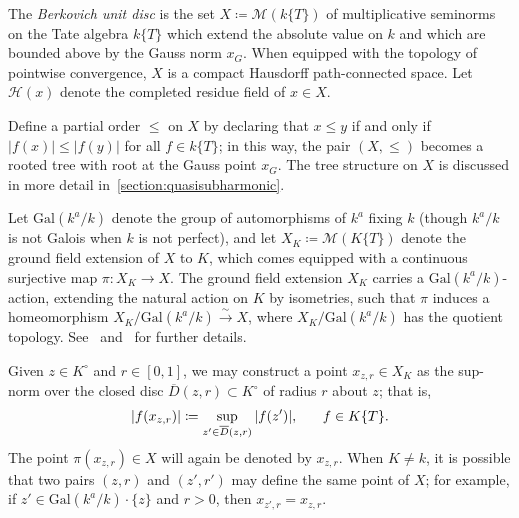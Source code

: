 \documentclass[10pt,reqno]{amsart}
\theoremstyle{plain}
\theoremstyle{definition}
\renewcommand{\H}{\mathcal{H}}
\numberwithin{equation}{section}
\newcommand{\Gal}{\textrm{Gal}}
\newcommand{\M}{\mathcal{M}}
\begin{document}
The \emph{Berkovich unit disc} is the set $X \coloneqq \M(k\{ T \})$ of multiplicative seminorms on the Tate algebra $k\{ T \}$ which extend the absolute value on $k$ and which are bounded above by the Gauss norm $x_G$.
When equipped with the topology of pointwise convergence, $X$ is a compact Hausdorff path-connected space. 
Let $\H(x)$ denote the completed residue field of $x \in X$.

Define a partial order $\leq $ on $X$ by declaring that $x \leq y$ if and only if $|f(x)| \leq |f(y)|$ for all $f \in k\{ T \}$; in this way, the pair $(X, \leq )$ becomes a rooted tree with root at the Gauss point $x_G$. The tree structure on $X$ is discussed in more detail in~\cref{section:quasisubharmonic}. 

Let $\Gal(k^a/k)$ denote the group of automorphisms of $k^a$ fixing $k$ (though $k^a/k$ is not Galois when $k$ is not perfect), and let $X_K \coloneqq \M(K \{ T \})$ denote the ground field extension of $X$ to $K$, which comes equipped with a continuous surjective map $\pi \colon X_K \to X$. The ground field extension $X_K$ carries a $\Gal(k^a/k)$-action, extending the natural action on $K$ by isometries, such that $\pi$ induces a homeomorphism $X_K / \Gal(k^a/k) \stackrel{\sim}{\longrightarrow} X$, where $X_K /\Gal(k^a/k)$ has the quotient topology. See~\cite[p.18]{berkovich} and~\cite[\S1]{baker-rumely} for further details.

Given $z \in K^{\circ}$ and $r \in [0,1]$, we may construct a point $x_{z,r} \in X_K$ as the sup-norm over the closed disc $\overline{D}(z,r) \subset K^{\circ}$ of radius $r$ about $z$; that is,
$$
|f(x_{z,r})| \coloneqq \sup_{z' \in \overline{D}(z,r)} |f(z')|, \textrm{\hspace{5mm} $f \in K\{ T \}$.}
$$ 
The point $\pi(x_{z,r}) \in X$ will again be denoted by $x_{z,r}$. When $K \not= k$, it is possible that two pairs $(z,r)$ and $(z',r')$ may define the same point of $X$; for example, if $z' \in \Gal(k^a/k) \cdot \{ z \}$ and $r > 0$, then $x_{z',r} = x_{z,r}$.
\end{document}

